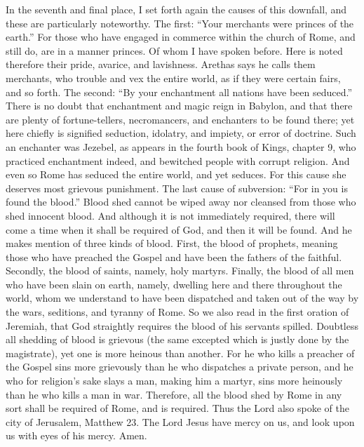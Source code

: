 In the seventh and final place, I set forth again the causes of this downfall, and these are particularly noteworthy. The first: “Your merchants were princes of the earth.” For those who have engaged in commerce within the church of Rome, and still do, are in a manner princes. Of whom I have spoken before. Here is noted therefore their pride, avarice, and lavishness. Arethas says he calls them merchants, who trouble and vex the entire world, as if they were certain fairs, and so forth. The second: “By your enchantment all nations have been seduced.” There is no doubt that enchantment and magic reign in Babylon, and that there are plenty of fortune-tellers, necromancers, and enchanters to be found there; yet here chiefly is signified seduction, idolatry, and impiety, or error of doctrine. Such an enchanter was Jezebel, as appears in the fourth book of Kings, chapter 9, who practiced enchantment indeed, and bewitched people with corrupt religion. And even so Rome has seduced the entire world, and yet seduces. For this cause she deserves most grievous punishment. The last cause of subversion: “For in you is found the blood.” Blood shed cannot be wiped away nor cleansed from those who shed innocent blood. And although it is not immediately required, there will come a time when it shall be required of God, and then it will be found. And he makes mention of three kinds of blood. First, the blood of prophets, meaning those who have preached the Gospel and have been the fathers of the faithful. Secondly, the blood of saints, namely, holy martyrs. Finally, the blood of all men who have been slain on earth, namely, dwelling here and there throughout the world, whom we understand to have been dispatched and taken out of the way by the wars, seditions, and tyranny of Rome. So we also read in the first oration of Jeremiah, that God straightly requires the blood of his servants spilled. Doubtless all shedding of blood is grievous (the same excepted which is justly done by the magistrate), yet one is more heinous than another. For he who kills a preacher of the Gospel sins more grievously than he who dispatches a private person, and he who for religion’s sake slays a man, making him a martyr, sins more heinously than he who kills a man in war. Therefore, all the blood shed by Rome in any sort shall be required of Rome, and is required. Thus the Lord also spoke of the city of Jerusalem, Matthew 23. The Lord Jesus have mercy on us, and look upon us with eyes of his mercy. Amen.
